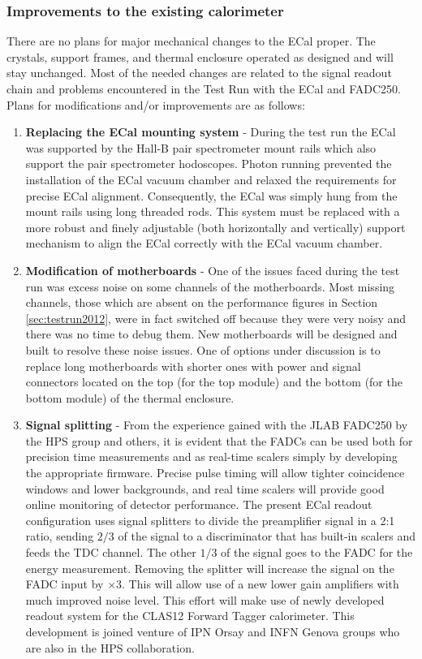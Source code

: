 \subsubsection{Improvements to the existing calorimeter}

There are no plans for major mechanical changes to the ECal proper. The crystals, support frames, and thermal enclosure operated as designed and will stay unchanged. Most of the needed changes are related to the signal readout chain and problems encountered in the Test Run with the ECal and FADC250. Plans for  
modifications and/or improvements are as follows: 

\begin{enumerate}
\item {\bf Replacing the ECal mounting system} - 
During the test run the ECal was supported by the Hall-B pair spectrometer mount rails which also support the pair spectrometer hodoscopes. 
Photon running prevented the installation of the ECal vacuum chamber and relaxed the requirements for precise ECal alignment. Consequently, the ECal was simply hung from the mount rails using  long threaded rods. This system must be replaced with a more robust and finely adjustable (both horizontally and vertically) support mechanism to  align the  ECal correctly with the ECal vacuum chamber.

\item {\bf Modification of motherboards} - One of the issues  faced during the test run was excess noise on some channels of the motherboards. 
Most missing channels, those which are absent on the performance figures in Section \ref{sec:testrun2012}, were in fact switched off because they were very noisy and there was no time to debug them. New motherboards will be designed and built to resolve these noise issues. One of options under discussion is to replace long motherboards with shorter ones with power and signal connectors 
located on the top (for the top module) and the bottom (for the bottom module) of the thermal enclosure. 

\item {\bf Signal splitting} - From the experience gained with the JLAB FADC250 by the HPS group and others, it is evident that the FADCs can be used both for precision time measurements and as 
real-time scalers simply by developing the appropriate firmware.
Precise pulse timing will allow tighter coincidence windows and lower backgrounds, and real time scalers will provide good online monitoring of detector performance. The present ECal readout configuration uses signal splitters to divide the preamplifier signal in  a 2:1 ratio, sending 
$2/3$ of the signal to a discriminator that has built-in scalers and feeds the TDC channel. The other $1/3$ of the 
signal goes to the FADC for the energy measurement. Removing the splitter will increase the signal on the FADC input by $\times 3$. This will allow use of a new lower gain amplifiers with much improved noise level. This effort will make use of newly developed readout system for the CLAS12 Forward Tagger calorimeter. This development is joined venture of IPN Orsay and INFN Genova groups who are also in the HPS collaboration.

 

\end{enumerate}

